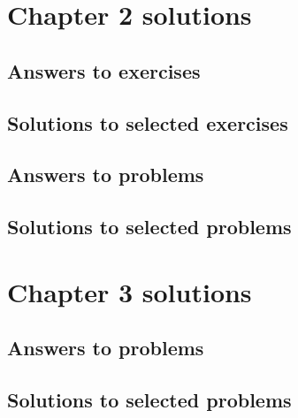 	\section*{Chapter 2 solutions}
	\label{sec:chapter1sols}	
	{ \footnotesize 

		\subsection*{Answers to exercises}

		\subsection*{Solutions to selected exercises}
		
		\subsection*{Answers to problems}

		\subsection*{Solutions to selected problems}

	}  %



	\section*{Chapter 3 solutions}
	\label{sec:chapter3sols}	
	{ \footnotesize 

		\subsection*{Answers to problems}

		\subsection*{Solutions to selected problems}

	}  %

